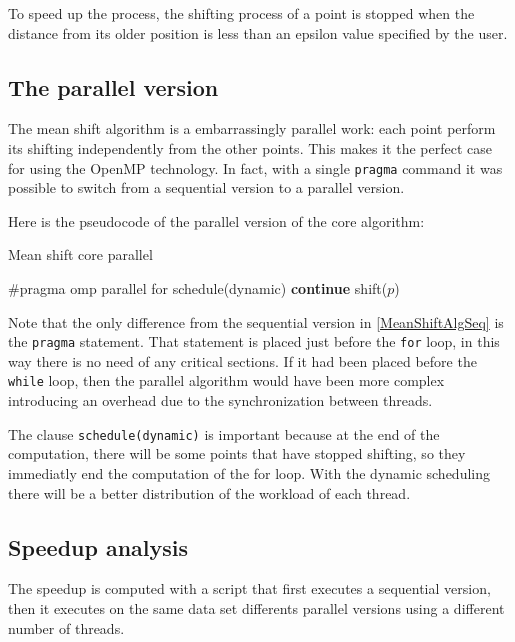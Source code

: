\documentclass[10pt,twocolumn,letterpaper]{article}
\begin{document}
To speed up the process, the shifting process of a point is stopped when the distance from its older position is less than an epsilon value specified by the user.


\subsection{The parallel version}

The mean shift algorithm is a embarrassingly parallel work: each point perform its shifting independently from the other points. This makes it the perfect case for using the OpenMP technology. In fact, with a single \verb"pragma" command it was possible to switch from a sequential version to a parallel version.

Here is the pseudocode of the parallel version of the core algorithm:

\begin{algorithm}
\label{MeanShiftAlgPar}
\caption{Mean shift core parallel}
\begin{algorithmic}

		\State \#pragma omp parallel for schedule(dynamic)
    				\State \textbf{continue}
    			\EndIf
    		\State shift($p$)
    		\EndFor
    \EndWhile

\end{algorithmic}
\end{algorithm}

Note that the only difference from the sequential version in \ref{MeanShiftAlgSeq} is the \verb"pragma" statement. That statement is placed just before the \verb"for" loop, in this way there is no need of any critical sections. If it had been placed before the \verb"while" loop, then the parallel algorithm would have been more complex introducing an overhead due to the synchronization between threads.

The clause \verb"schedule(dynamic)" is important because at the end of the computation, there will be some points that have stopped shifting, so they immediatly end the computation of the for loop. With the dynamic scheduling there will be a better distribution of the workload of each thread.

\subsection{Speedup analysis}

The speedup is computed with a script that first executes a sequential version, then it executes on the same data set differents parallel versions using a different number of threads. 
\end{document}
